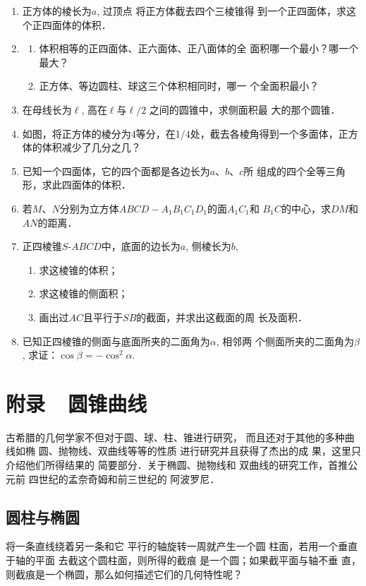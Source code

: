 \begin{enumerate}
\item 正方体的棱长为$a$, 过顶点
将正方体截去四个三棱锥得
到一个正四面体，求这个正四面体的体积．
\item \begin{enumerate}
    \item 体积相等的正四面体、正六面体、正八面体的全
    面积哪一个最小？哪一个最大？
    \item 正方体、等边圆柱、球这三个体积相同时，哪一
    个全面积最小？
\end{enumerate}
\item 在母线长为$\ell$, 高在$\ell$与$\ell/2$
之间的圆锥中，求侧面积最
大的那个圆锥．
\item 如图，将正方体的棱分为4等分，在1/4处，截去各棱角得到一个多面体，正方体的体积减少了几分之几？
\item 已知一个四面体，它的四个面都是各边长为$a$、$b$、$c$所
组成的四个全等三角形，求此四面体的体积．
\item 若$M$、$N$分别为立方体$ABCD-A_1B_1C_1D_1$的面$A_1C_1$和
$B_1C$的中心，求$DM$和$AN$的距离．
\item 正四棱锥$S$-$ABCD$中，底面的边长为$a$, 侧棱长为$b$,
\begin{enumerate}
    \item 求这棱锥的体积；
    \item 求这棱锥的侧面积；
    \item 画出过$AC$且平行于$SB$的截面，并求出这截面的周
长及面积．
\end{enumerate}

\item 已知正四棱锥的侧面与底面所夹的二面角为$\alpha$, 相邻两
个侧面所夹的二面角为$\beta$, 求证：$\cos\beta=-\cos^2\alpha$.
\end{enumerate}

\section{附录~~圆锥曲线}
古希腊的几何学家不但对于圆、球、柱、锥进行研究，
而且还对于其他的多种曲线如椭
圆、抛物线、双曲线等等的性质
进行研究并且获得了杰出的成
果，这里只介绍他们所得结果的
简要部分．关于椭圆、抛物线和
双曲线的研究工作，首推公元前
四世纪的孟奈奇姆和前三世纪的
阿波罗尼．

\subsection{圆柱与椭圆}
将一条直线绕着另一条和它
平行的轴旋转一周就产生一个圆
柱面，若用一个垂直于轴的平面
去截这个圆柱面，则所得的截痕
是一个圆；如果截平面与轴不垂
直，则截痕是一个椭圆，那么如何描述它们的几何特性呢？

